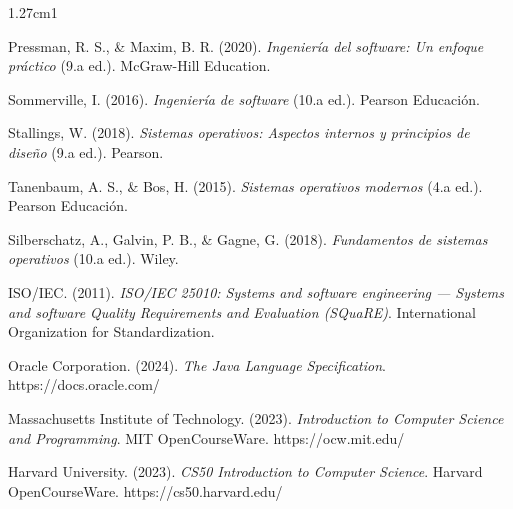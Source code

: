 \documentclass[12pt,a4paper]{article}
\begin{document}
	\begin{hangparas}{1.27cm}{1}
		
		Pressman, R. S., \& Maxim, B. R. (2020). \textit{Ingeniería del software: Un enfoque práctico} (9.a ed.). McGraw-Hill Education.
		
		Sommerville, I. (2016). \textit{Ingeniería de software} (10.a ed.). Pearson Educación.
		
		Stallings, W. (2018). \textit{Sistemas operativos: Aspectos internos y principios de diseño} (9.a ed.). Pearson.
		
		Tanenbaum, A. S., \& Bos, H. (2015). \textit{Sistemas operativos modernos} (4.a ed.). Pearson Educación.
		
		Silberschatz, A., Galvin, P. B., \& Gagne, G. (2018). \textit{Fundamentos de sistemas operativos} (10.a ed.). Wiley.
		
		ISO/IEC. (2011). \textit{ISO/IEC 25010: Systems and software engineering — Systems and software Quality Requirements and Evaluation (SQuaRE)}. International Organization for Standardization.
		
		Oracle Corporation. (2024). \textit{The Java Language Specification}. https://docs.oracle.com/
		
		Massachusetts Institute of Technology. (2023). \textit{Introduction to Computer Science and Programming}. MIT OpenCourseWare. https://ocw.mit.edu/
		
		Harvard University. (2023). \textit{CS50 Introduction to Computer Science}. Harvard OpenCourseWare. https://cs50.harvard.edu/
		
	\end{hangparas}
	
	\ClearShipoutPictureBG
	
\end{document}
